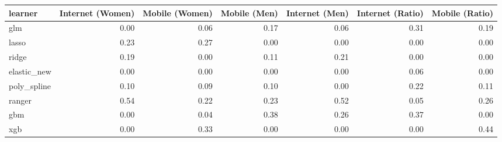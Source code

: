 \begin{table}[ht]
\centering
\begin{tabular}{lrrrrrr}
  \toprule
learner & Internet (Women) & Mobile (Women) & Mobile (Men) & Internet (Men) & Internet (Ratio) & Mobile (Ratio) \\ 
  \midrule
glm & 0.00 & 0.06 & 0.17 & 0.06 & 0.31 & 0.19 \\ 
  lasso & 0.23 & 0.27 & 0.00 & 0.00 & 0.00 & 0.00 \\ 
  ridge & 0.19 & 0.00 & 0.11 & 0.21 & 0.00 & 0.00 \\ 
  elastic\_new & 0.00 & 0.00 & 0.00 & 0.00 & 0.06 & 0.00 \\ 
  poly\_spline & 0.10 & 0.09 & 0.10 & 0.00 & 0.22 & 0.11 \\ 
  ranger & 0.54 & 0.22 & 0.23 & 0.52 & 0.05 & 0.26 \\ 
  gbm & 0.00 & 0.04 & 0.38 & 0.26 & 0.37 & 0.00 \\ 
  xgb & 0.00 & 0.33 & 0.00 & 0.00 & 0.00 & 0.44 \\ 
   \bottomrule
\end{tabular}
\end{table}
